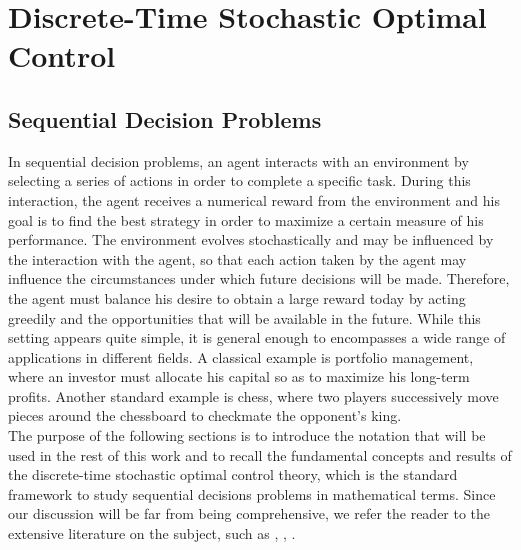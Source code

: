 \chapter{Discrete-Time Stochastic Optimal Control}
\label{ch:discrete_time_stochastic_optimal_control}

\section{Sequential Decision Problems}
In sequential decision problems, an agent interacts with an environment by
selecting a series of actions in order to complete a specific task. During this
interaction, the agent receives a numerical reward from the environment and his
goal is to find the best strategy in order to maximize a certain measure of his
performance. The environment evolves stochastically and may be influenced by
the interaction with the agent, so that each action taken by the agent may 
influence the circumstances under which future decisions will be made. 
Therefore, the agent must balance his desire to obtain a large reward today 
by acting greedily and the opportunities that will be available in the future. 
While this setting appears quite simple, it is general enough to encompasses a 
wide range of applications in different fields. A classical example is 
portfolio management, where an investor must allocate his capital so as to 
maximize his long-term profits. Another standard example is chess, where two
players successively move pieces around the chessboard to checkmate the
opponent's king.\\
The purpose of the following sections is to introduce the notation that will be
used in the rest of this work and to recall the fundamental concepts and 
results of the discrete-time stochastic optimal control theory, which is the 
standard framework to study sequential decisions problems in mathematical
terms. Since our discussion will be far from being comprehensive, we refer the
reader to the extensive literature on the subject, such as
\cite{bertsekas1978stochastic}, \cite{puterman1994markov}, 
\cite{bertsekas1995dynamic}.


